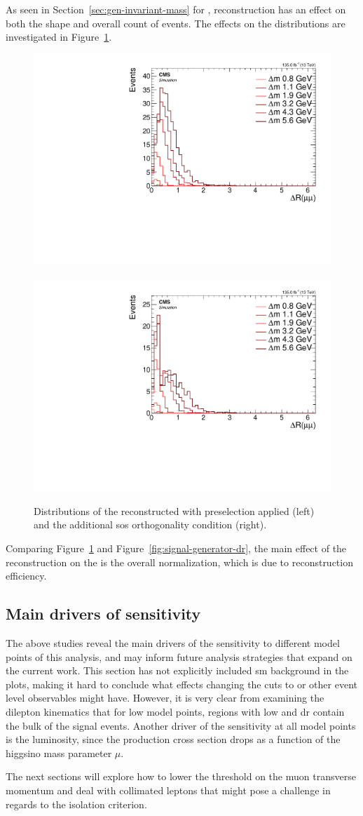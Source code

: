 As seen in Section~\ref{sec:gen-invariant-mass} for \mmumu, reconstruction has an effect on both the shape and overall count of events. The effects on the \drmm distributions are investigated in Figure~\ref{fig:reco-signal-dr}.

\begin{figure}[!htb]
\centering
\includegraphics[width=0.48\linewidth]{plots/signal_muons/none_deltaRCorrJetNoMultIso10Dr0.6.pdf} \,
\includegraphics[width=0.48\linewidth]{plots/signal_muons/none_deltaRCorrJetNoMultIso10Dr0.6_orth.pdf}  \\
\caption[Distributions of the reconstructed \drmm in signal events]{ Distributions of the reconstructed \drmm with preselection applied (left) and the additional \gls{sos} orthogonality condition (right).}
\label{fig:reco-signal-dr}
\end{figure}

Comparing Figure~\ref{fig:reco-signal-dr} and Figure~\ref{fig:signal-generator-dr}, the main effect of the reconstruction on the \drmm is the overall normalization, which is due to reconstruction efficiency.

\clearpage 
\subsection{Main drivers of sensitivity}

The above studies reveal the main drivers of the sensitivity to different model points of this analysis, and may inform future analysis strategies that expand on the current work. This section has not explicitly included \gls{sm} background in the plots, making it hard to conclude what effects changing the cuts to \MET or other event level observables might have. However, it is very clear from examining the dilepton kinematics that for low \dm model points, regions with low \pt and \gls{dr} contain the bulk of the signal events. Another driver of the sensitivity at all \dm model points is the luminosity, since the production cross section drops as a function of the higgsino mass parameter $\mu$.

The next sections will explore how to lower the threshold on the muon transverse momentum and deal with collimated leptons that might pose a challenge in regards to the isolation criterion.
